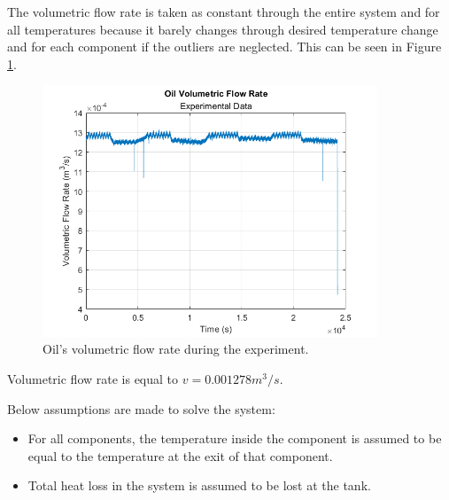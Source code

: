 \par
The volumetric flow rate is taken as constant through the entire system and for all temperatures because it barely changes through desired temperature change and for each component if the outliers are neglected. This can be seen in Figure \ref{fig:volumetric}.

\begin{figure}[h]
    \centering
    \includegraphics[width=10cm]{images/flowrate.png}
    \caption{Oil's volumetric flow rate during the experiment.}
    \label{fig:volumetric}
\end{figure}

\par
Volumetric flow rate is equal to $v = 0.001278 m^3/s$.

\par
Below assumptions are made to solve the system:
\begin{itemize}
    \item For all components, the temperature inside the component is assumed to be equal to the temperature at the exit of that component.
    \item Total heat loss in the system is assumed to be lost at the tank.
\end{itemize}

